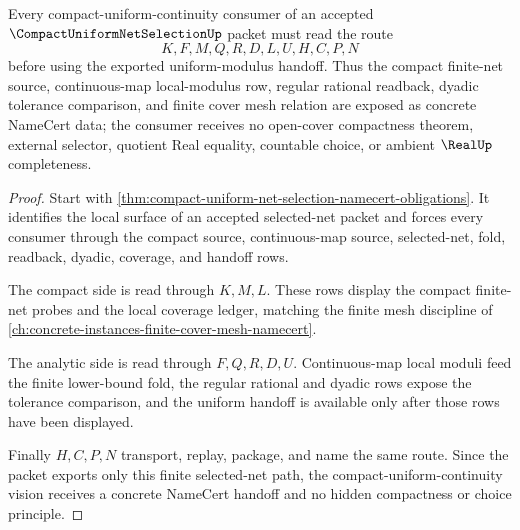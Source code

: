 \begin{theorem}
\label{thm:compact-uniform-net-selection-vision-handoff}
Every compact-uniform-continuity consumer of an accepted $\CompactUniformNetSelectionUp$ packet must read the route
$$
K,F,M,Q,R,D,L,U,H,C,P,N
$$
before using the exported uniform-modulus handoff. Thus the compact finite-net source, continuous-map local-modulus row, regular rational readback, dyadic tolerance comparison, and finite cover mesh relation are exposed as concrete NameCert data; the consumer receives no open-cover compactness theorem, external selector, quotient Real equality, countable choice, or ambient $\RealUp$ completeness.
\end{theorem}
\begin{proof}
Start with \autoref{thm:compact-uniform-net-selection-namecert-obligations}. It identifies the local surface of an accepted selected-net packet and forces every consumer through the compact source, continuous-map source, selected-net, fold, readback, dyadic, coverage, and handoff rows.

The compact side is read through $K,M,L$. These rows display the compact finite-net probes and the local coverage ledger, matching the finite mesh discipline of \autoref{ch:concrete-instances-finite-cover-mesh-namecert}.

The analytic side is read through $F,Q,R,D,U$. Continuous-map local moduli feed the finite lower-bound fold, the regular rational and dyadic rows expose the tolerance comparison, and the uniform handoff is available only after those rows have been displayed.

Finally $H,C,P,N$ transport, replay, package, and name the same route. Since the packet exports only this finite selected-net path, the compact-uniform-continuity vision receives a concrete NameCert handoff and no hidden compactness or choice principle.
\end{proof}




